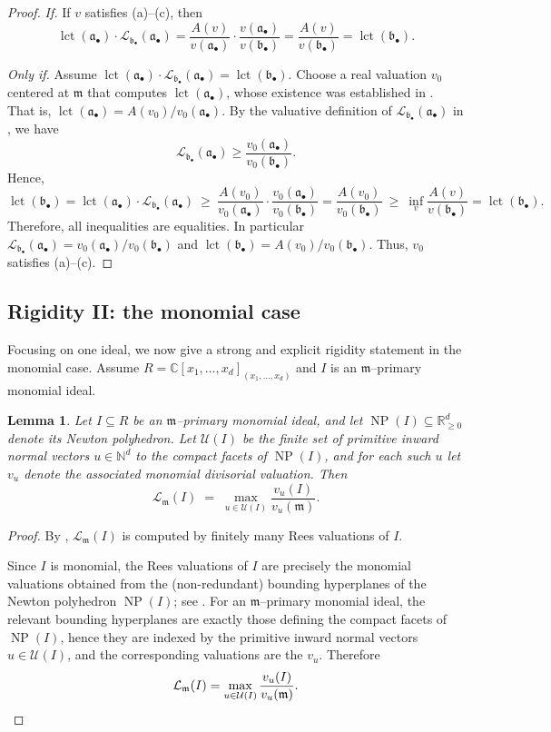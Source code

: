 \documentclass[12pt]{amsart}
\newcommand{\CC}{\mathbb{C}}
\newcommand{\m}{\mathfrak m}
\renewcommand{\a}{\mathfrak{a}}
\renewcommand{\b}{\mathfrak{b}}
\newcommand{\lct}{\operatorname{\mathrm{lct}}}
\newcommand{\Loj}{\mathcal{L}} %
\DeclareMathOperator{\NP}{NP}
\newcommand{\abul}{{\a_\bullet}}
\newcommand{\bbul}{{\b_\bullet}}
\theoremstyle{plain}
\newtheorem{lemma}[theorem]{Lemma}
\theoremstyle{definition}
\numberwithin{equation}{section}
\begin{document}
\begin{proof}
\emph{If.}
If $v$ satisfies (a)--(c), then
\[
\lct(\abul)\cdot \Loj_{\bbul}(\abul)
=
\frac{A(v)}{v(\abul)}\cdot \frac{v(\abul)}{v(\bbul)}
=
\frac{A(v)}{v(\bbul)}
=
\lct(\bbul).
\]

\smallskip
\noindent
\emph{Only if.}
Assume $\lct(\abul) \cdot \Loj_{\bbul}(\abul) = \lct(\bbul)$.
Choose a real valuation $v_0$ centered at $\m$ that computes $\lct(\abul)$, whose existence was established in \cite[Theorem A]{JM12}. That is,
$\lct(\abul)=A(v_0)/v_0(\abul)$.
By the valuative definition of $\Loj_{\bbul}(\abul)$ in , we have
\[
\Loj_{\bbul}(\abul) \ge \frac{v_0(\abul)}{v_0(\bbul)}.
\]
Hence,
\[
\lct(\bbul) = \lct(\abul) \cdot \Loj_{\bbul}(\abul)
\ \ge\
\frac{A(v_0)}{v_0(\abul)}\cdot \frac{v_0(\abul)}{v_0(\bbul)}
=
\frac{A(v_0)}{v_0(\bbul)}
\ \ge\
\inf_v\frac{A(v)}{v(\bbul)}
=
\lct(\bbul).
\]
Therefore, all inequalities are equalities. In particular
$\Loj_{\bbul}(\abul)=v_0(\abul)/v_0(\bbul)$ and $\lct(\bbul) = A(v_0)/v_0(\bbul)$.
Thus, $v_0$ satisfies (a)--(c).
\end{proof}

\subsection{Rigidity II: the monomial case}
Focusing on one ideal, we now give a strong and explicit rigidity statement in the monomial case.
Assume $R=\CC[x_1,\dots,x_d]_{(x_1,\dots,x_d)}$ and $I$ is an $\m$--primary monomial ideal.
 
 
\begin{lemma}
\label{lem:monomial-Lojasiewicz-finite-max}
Let $I\subseteq R$ be an $\m$--primary monomial ideal,
and let $\NP(I)\subseteq \mathbb{R}_{\ge 0}^d$ denote its Newton polyhedron.
Let $\mathcal U(I)$ be the finite set of primitive inward normal vectors
$u\in \mathbb{N}^d$ to the compact facets of\/ $\NP(I)$, and for each such $u$
let $v_u$ denote the associated monomial divisorial valuation.
Then
\[
\Loj_{\m}(I)
\;=\;
\max_{u\in \mathcal U(I)} \frac{v_u(I)}{v_u(\m)}.
\]
\end{lemma}

\begin{proof}
By , $\Loj_{\m}(I)$ is computed by finitely many Rees valuations of $I$.

Since $I$ is monomial, the Rees valuations of $I$
are precisely the monomial valuations obtained from the (non-redundant) bounding
hyperplanes of the Newton polyhedron $\NP(I)$; see \cite[Theorem~10.3.5]{HS}.
For an $\m$--primary monomial ideal, the relevant bounding hyperplanes are exactly
those defining the compact facets of $\NP(I)$, hence they are indexed by the primitive
inward normal vectors $u\in \mathcal U(I)$, and the corresponding valuations are the $v_u$.
Therefore
\[
\Loj_{\m}(I)
=
\max_{u\in \mathcal U(I)} \frac{v_u(I)}{v_u(\m)}. \qedhere
\]
\end{proof}
\end{document}
